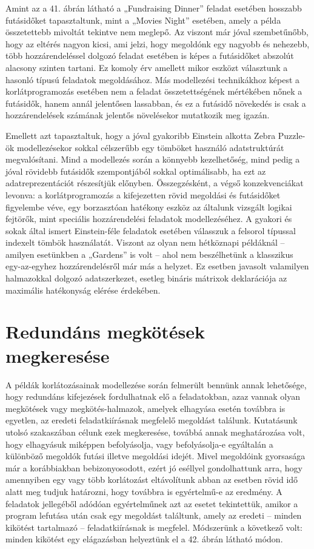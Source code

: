 \documentclass[12pt,a4paper,twoside, openright]{report}
\begin{document}

    Amint az a 41. ábrán látható a „Fundraising Dinner” feladat esetében hosszabb futásidőket tapasztaltunk, mint a „Movies Night” esetében, amely a példa összetettebb mivoltát tekintve nem meglepő.
    Az viszont már jóval szembetűnőbb, hogy az eltérés nagyon kicsi, ami jelzi, hogy megoldónk egy nagyobb és nehezebb, több hozzárendeléssel dolgozó feladat esetében is képes a futásidőket abszolút alacsony szinten tartani.
    Ez komoly érv amellett mikor eszközt választunk a hasonló típusú feladatok megoldásához.
    Más modellezési technikákhoz képest a korlátprogramozás esetében nem a feladat összetettségének mértékében nőnek a futásidők, hanem annál jelentősen lassabban, és ez a futásidő növekedés is csak a hozzárendelések számának jelentős növelésekor mutatkozik meg igazán.

    Emellett azt tapasztaltuk, hogy a jóval gyakoribb Einstein alkotta Zebra Puzzle-ök modellezésekor sokkal célszerűbb egy tömböket használó adatstruktúrát megvalósítani.
    Mind a modellezés során a könnyebb kezelhetőség, mind pedig a jóval rövidebb futásidők szempontjából sokkal optimálisabb, ha ezt az adatreprezentációt részesítjük előnyben.
    Összegzésként, a végső konzekvenciákat levonva: a korlátprogramozás a kifejezetten rövid megoldási és futásidőket figyelembe véve, egy borzasztóan hatékony eszköz az általunk vizsgált logikai fejtörők, mint speciális hozzárendelési feladatok modellezéséhez.
    A gyakori és sokak által ismert Einstein-féle feladatok esetében válasszuk a felsorol típussal indexelt tömbök használatát.
    Viszont az olyan nem hétköznapi példáknál – amilyen esetünkben a „Gardens” is volt – ahol nem beszélhetünk a klasszikus egy-az-egyhez hozzárendelésről már más a helyzet.
    Ez esetben javasolt valamilyen halmazokkal dolgozó adatszerkezet, esetleg bináris mátrixok deklarációja az maximális hatékonyság elérése érdekében.

\chapter{Redundáns megkötések megkeresése}

    A példák korlátozásainak modellezése során felmerült bennünk annak lehetősége, hogy redundáns kifejezések fordulhatnak elő a feladatokban, azaz vannak olyan megkötések vagy megkötés-halmazok, amelyek elhagyása esetén továbbra is egyetlen, az eredeti feladatkiírásnak megfelelő megoldást találunk.
    Kutatásunk utolsó szakaszában célunk ezek megkeresése, továbbá annak meghatározása volt, hogy elhagyásuk miképpen befolyásolja, vagy befolyásolja-e egyáltalán a különböző megoldók futási illetve megoldási idejét.
    Mivel megoldóink gyorsasága már a korábbiakban bebizonyosodott, ezért jó eséllyel gondolhattunk arra, hogy amennyiben egy vagy több korlátozást eltávolítunk abban az esetben rövid idő alatt meg tudjuk határozni, hogy továbbra is egyértelmű-e az eredmény.
    A feladatok jellegéből adódóan egyértelműnek azt az esetet tekintettük, amikor a program lefutása után csak egy megoldást találtunk, amely az eredeti – minden kikötést tartalmazó – feladatkiírásnak is megfelel.
    Módszerünk a következő volt: minden kikötést egy elágazásban helyeztünk el a 42. ábrán látható módon.
\end{document}
